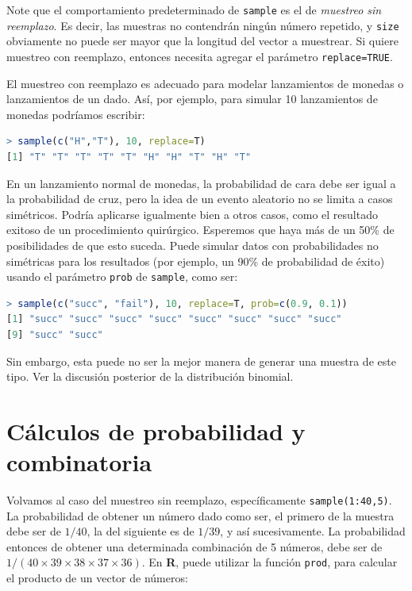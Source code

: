 Note que el comportamiento predeterminado de \texttt{sample} es el de
\textit{muestreo sin reemplazo}. Es decir, las muestras no contendrán ningún
número repetido, y \texttt{size} obviamente no puede ser mayor que la longitud
del vector a muestrear. Si quiere muestreo con reemplazo, entonces necesita
agregar el parámetro \texttt{replace=TRUE}.

El muestreo con reemplazo es adecuado para modelar lanzamientos de monedas o
lanzamientos de un dado. Así, por ejemplo, para simular 10 lanzamientos de
monedas podríamos escribir:

\begin{lstlisting}[language=R]
> sample(c("H","T"), 10, replace=T)
[1] "T" "T" "T" "T" "T" "H" "H" "T" "H" "T"
\end{lstlisting}

En un lanzamiento normal de monedas, la probabilidad de cara debe ser igual a la
probabilidad de cruz, pero la idea de un evento aleatorio no se limita a casos
simétricos.  Podría aplicarse igualmente bien a otros casos, como el resultado
exitoso de un procedimiento quirúrgico. Esperemos que haya más de un 50\% de
posibilidades de que esto suceda. Puede simular datos con probabilidades no
simétricas para los resultados (por ejemplo, un 90\% de probabilidad de éxito)
usando el parámetro \texttt{prob} de \texttt{sample}, como ser:

\begin{lstlisting}[language=R]
> sample(c("succ", "fail"), 10, replace=T, prob=c(0.9, 0.1))
[1] "succ" "succ" "succ" "succ" "succ" "succ" "succ" "succ"
[9] "succ" "succ"
\end{lstlisting}

Sin embargo, esta puede no ser la mejor manera de generar una muestra de este
tipo. Ver la discusión posterior de la distribución binomial.

\section{Cálculos de probabilidad y combinatoria}

Volvamos al caso del muestreo sin reemplazo, específicamente
\texttt{sample(1:40,5)}. La probabilidad de obtener un número dado como ser, el
primero de la muestra debe ser de $1/40$, la del siguiente es de $1/39$, y así
sucesivamente. La probabilidad entonces  de obtener una determinada combinación
de 5 números,  debe ser de $1/(40 \times 39 \times 38 \times 37 \times 36)$.  En
\textbf{R}, puede utilizar la función \texttt{prod}, para calcular el producto
de un vector de números:

